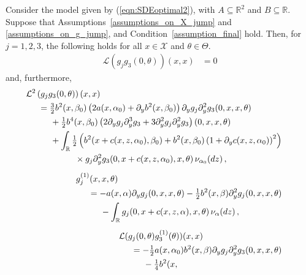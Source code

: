 \documentclass[11pt,a4paper]{article}
\newcommand{\alphan}{{\alpha_0}}
\newcommand{\betan}{{\beta_0}}
\newcommand{\RR}{{\mathbb R}}
\renewcommand{\ll}{{\mathcal{L}}}
\newcommand{\xx}{{\mathcal{X}}}
\numberwithin{equation}{section}
\numberwithin{theorem}{section}
\begin{document}
\begin{lemma}
Consider the model given by (\ref{eqn:SDEoptimal2}), with
  $A\subseteq \RR^2$ and $B\subseteq \RR$. Suppose that Assumptions~\ref{assumptions_on_X_jump} and
\ref{assumptions_on_g_jump}, and Condition~\ref{assumption_final} hold. 
Then, for $j=1,2,3$, the following holds for all $x\in \xx$
and $\theta \in \Theta$.
\begin{align*}
\ll \left(g_{j}g_3(0, \theta)\right)(x,x) &= 0
\end{align*}
and, furthermore,
\begin{align*}
\begin{split}
&\hspace{-5mm} \ll^2\left( g_{j}g_{3}(0,\theta)\right)(x,x) \\
&= \tfrac{3}{2}b^2(x, \betan) \left( 2a(x, \alphan) + \partial_y b^2(x,
  \betan)\right)
  \partial_y g_{j} \partial_y^2 g_{3}(0,x,x, \theta)\\
&\hspace{5mm} +\tfrac{1}{2} b^4(x, \betan)\left(2\partial_y g_{j} \partial_y^3 g_{3}  + 3\partial_y^2
  g_{j} \partial_y^2 g_{3} 
\right)(0,x,x, \theta)  \\
&\hspace{5mm} + \int_\RR \tfrac{1}{2} \left( b^2(
x+c(x,z,\alphan),
\betan)+ b^2(x, \betan) \left( 1
  + \partial_y c(x,z, \alphan)\right)^2 \right) \\
&\hspace{15mm} \times g_{j}\partial^2_y g_{3}(0,x+c(x,z,\alphan),x,
\theta)\, \nu_\alphan(dz) \,,
\end{split}\\[0.5em]
\begin{split}
& \hspace{-5mm} g_{j}^{(1)}(x,x, \theta)\\
&= -a(x, \alpha)\partial_y g_{j}(0,x,x, \theta) - \tfrac{1}{2}b^2(x,
  \beta)\partial^2_y g_{j}(0,x,x, \theta) \\
&\hspace{5mm} - \int_\RR g_{j}(0,x+c(x,z,\alpha),x, \theta)\,
  \nu_\alpha(dz)\,,
\end{split}\\[0.5em]
  \begin{split}
&\hspace{-5mm} \ll (
  g_{j}(0,\theta)g_{3}^{(1)}(\theta) )(x,x) \\
&=-\tfrac{1}{2} a(x, \alphan) b^2(x,
  \beta)\partial_y g_{j}\partial^2_y
g_{3}(0,x,x, \theta)\\
&\hspace{5mm}-\tfrac{1}{4}b^2(x,

\end{split}
\end{align*}
\end{lemma}
\end{document}
